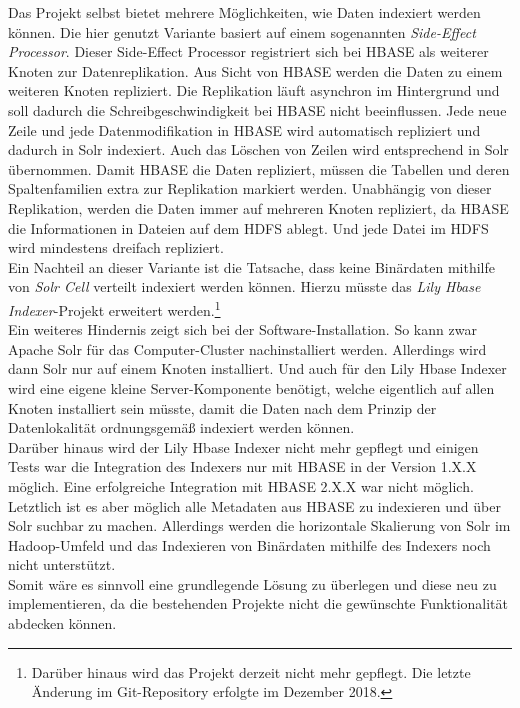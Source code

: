 \noindent
Das Projekt selbst bietet mehrere Möglichkeiten, wie Daten indexiert werden können. Die hier genutzt Variante basiert auf einem sogenannten \textit{Side-Effect Processor}.\cite{hbase_sep} 
Dieser Side-Effect Processor registriert sich bei HBASE als weiterer Knoten zur Datenreplikation. Aus Sicht von HBASE werden die Daten zu einem weiteren Knoten repliziert. Die Replikation läuft asynchron im Hintergrund und soll dadurch die Schreibgeschwindigkeit bei HBASE nicht beeinflussen. Jede neue Zeile und jede Datenmodifikation in HBASE wird automatisch repliziert und dadurch in Solr indexiert.
Auch das Löschen von Zeilen wird entsprechend in Solr übernommen. Damit HBASE die Daten repliziert, müssen die Tabellen und deren Spaltenfamilien extra zur Replikation markiert werden. Unabhängig von dieser Replikation, werden die Daten immer auf mehreren Knoten repliziert, da HBASE die Informationen in Dateien auf dem HDFS ablegt. Und jede Datei im HDFS wird mindestens dreifach repliziert.\\

\noindent
Ein Nachteil an dieser Variante ist die Tatsache, dass keine Binärdaten mithilfe von \textit{Solr Cell} verteilt indexiert werden können. Hierzu müsste das \textit{Lily Hbase Indexer}-Projekt erweitert werden.\footnote{Darüber hinaus wird das Projekt derzeit nicht mehr gepflegt. Die letzte Änderung im Git-Repository erfolgte im Dezember 2018.}\\

\noindent
Ein weiteres Hindernis zeigt sich bei der Software-Installation. So kann zwar Apache Solr für das Computer-Cluster nachinstalliert werden. Allerdings wird dann Solr nur auf einem Knoten installiert. Und auch für den Lily Hbase Indexer wird eine eigene kleine Server-Komponente benötigt, welche eigentlich auf allen Knoten installiert sein müsste, damit die Daten nach dem Prinzip der Datenlokalität ordnungsgemäß indexiert werden können.\\
Darüber hinaus wird der Lily Hbase Indexer nicht mehr gepflegt und einigen Tests war die Integration des Indexers nur mit HBASE in der Version 1.X.X möglich. Eine erfolgreiche Integration mit HBASE 2.X.X war nicht möglich.\\ 

\noindent
Letztlich ist es aber möglich alle Metadaten aus HBASE zu indexieren und über Solr suchbar zu machen. Allerdings werden die horizontale Skalierung von Solr im Hadoop-Umfeld und das Indexieren von Binärdaten mithilfe des Indexers noch nicht unterstützt.\\ 
Somit wäre es sinnvoll eine grundlegende Lösung zu überlegen und diese neu zu implementieren, da die bestehenden Projekte nicht die gewünschte Funktionalität abdecken können. 



